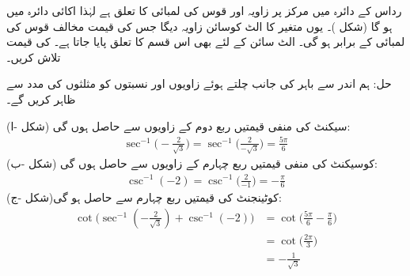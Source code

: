 رداس  کے دائرہ میں مرکز پر زاویہ  اور قوس کی لمبائی  کا تعلق  ہے لہٰذا  اکائی دائرہ میں  ہو گا (شکل )۔ یوں متغیر  کا الٹ کوسائن  زاویہ دیگا جس کی قیمت مخالف قوس کی لمبائی  کے برابر ہو گی۔ الٹ سائن کے لئے بھی اس قسم کا تعلق پایا جاتا ہے۔
 کی قیمت تلاش کریں۔

حل:\quad
ہم اندر سے باہر کی جانب چلتے ہوئے زاویوں اور نسبتوں کو مثلثوں  کی مدد سے ظاہر کریں گے۔

\quad
سیکنٹ کی منفی قیمتیں ربع دوم کے زاویوں سے حاصل ہوں گی (شکل -ا):
\begin{align*}
\sec^{-1}\big(-\frac{2}{\sqrt{3}}\big)=\sec^{-1}\big(\frac{2}{-\sqrt{3}}\big)=\frac{5\pi}{6}
\end{align*}
\quad
کوسیکنٹ کی منفی قیمتیں ربع چہارم کے زاویوں سے حاصل ہوں گی (شکل -ب):
\begin{align*}
\csc^{-1}(-2)=\csc^{-1}\big(\frac{2}{-1}\big)=-\frac{\pi}{6}
\end{align*}
 \quad
کوٹینجنٹ کی قیمتیں ربع چہارم سے حاصل ہو گی(شکل -ج):
\begin{align*}
\cot\big(\sec^{-1}(-\tfrac{2}{\sqrt{3}})+\csc^{-1}(-2)\big)&=\cot\big(\frac{5\pi}{6}-\frac{\pi}{6}\big)\\
&=\cot\big(\frac{2\pi}{3}\big)\\
&=-\frac{1}{\sqrt{3}}
\end{align*}
